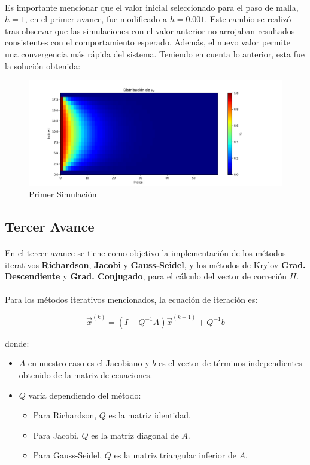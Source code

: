 \documentclass{article}
\begin{document}
  \paragraph{}
  Es importante mencionar que el valor inicial seleccionado para el paso de malla, $h=1$, en el primer avance, fue modificado a $h=0.001$. Este cambio se realizó tras observar que las simulaciones con el valor anterior no arrojaban resultados consistentes con el comportamiento esperado. Además, el nuevo valor permite una convergencia más rápida del sistema. Teniendo en cuenta lo anterior, esta fue la solución obtenida:

  \begin{figure}[H]
    \centering
    \includegraphics[width=1.2\textwidth]{GaussJordanSol.png}
    \caption{Primer Simulación}
  \end{figure}

  \subsection*{Tercer Avance}
  \paragraph{}
  En el tercer avance se tiene como objetivo la implementación de los métodos iterativos \textbf{Richardson}, \textbf{Jacobi} y \textbf{Gauss-Seidel}, y los métodos de Krylov \textbf{Grad. Descendiente} y \textbf{Grad. Conjugado}, para el cálculo del vector de correción $H$.

  \paragraph{}
  Para los métodos iterativos mencionados, la ecuación de iteración es:

  \[
  \vec{x}^{(k)}=(I-Q^{-1}A)\vec{x}^{(k-1)}+Q^{-1}b
  \]

  donde:
  \begin{itemize}
      \item $A$ en nuestro caso es el Jacobiano y $b$ es el vector de términos independientes obtenido de la matriz de ecuaciones.
      \item $Q$ varía dependiendo del método:
      \begin{itemize}
          \item Para Richardson, $Q$ es la matriz identidad.
          \item Para Jacobi, $Q$ es la matriz diagonal de $A$.
          \item Para Gauss-Seidel, $Q$ es la matriz triangular inferior de $A$.
      \end{itemize}
  \end{itemize}
\end{document}
